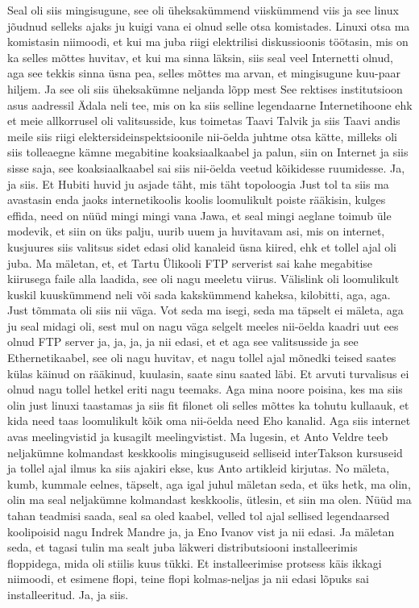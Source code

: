 Seal oli siis mingisugune, see oli üheksakümmend viiskümmend viis ja see linux jõudnud selleks ajaks ju kuigi vana ei olnud selle otsa komistades.
Linuxi otsa ma komistasin niimoodi, et kui ma juba riigi elektrilisi diskussioonis töötasin, mis on ka selles mõttes huvitav, et kui ma sinna läksin, siis seal veel Internetti olnud, aga see tekkis sinna üsna pea, selles mõttes ma arvan, et mingisugune kuu-paar hiljem. Ja see oli siis üheksakümne neljanda lõpp mest See rektises institutsioon asus aadressil Ädala neli tee, mis on ka siis selline legendaarne Internetihoone ehk et meie allkorrusel oli valitsusside, kus toimetas Taavi Talvik ja siis Taavi andis meile siis riigi elektersideinspektsioonile nii-öelda juhtme otsa kätte, milleks oli siis tolleaegne kämne megabitine koaksiaalkaabel ja palun, siin on Internet ja siis sisse saja, see koaksiaalkaabel sai siis nii-öelda veetud kõikidesse ruumidesse. Ja, ja siis.
Et Hubiti huvid ju asjade täht, mis täht topoloogia
Just tol ta siis ma avastasin enda jaoks internetikoolis koolis loomulikult poiste rääkisin, kulges effida, need on nüüd mingi mingi vana Jawa, et seal mingi aeglane toimub üle modevik, et siin on üks palju, uurib uuem ja huvitavam asi, mis on internet, kusjuures siis valitsus sidet edasi olid kanaleid üsna kiired, ehk et tollel ajal oli juba. Ma mäletan, et, et Tartu Ülikooli FTP serverist sai kahe megabitise kiirusega faile alla laadida, see oli nagu meeletu viirus. Välislink oli loomulikult kuskil kuuskümmend neli või sada kakskümmend kaheksa, kilobitti, aga, aga.
Just tõmmata oli siis nii väga.
Vot seda ma isegi, seda ma täpselt ei mäleta, aga ju seal midagi oli, sest mul on nagu väga selgelt meeles nii-öelda kaadri uut ees olnud FTP server ja, ja, ja, ja nii edasi, et et aga see valitsusside ja see Ethernetikaabel, see oli nagu huvitav, et nagu tollel ajal mõnedki teised saates külas käinud on rääkinud, kuulasin, saate sinu saated läbi. Et arvuti turvalisus ei olnud nagu tollel hetkel eriti nagu teemaks. Aga mina noore poisina, kes ma siis olin just linuxi taastamas ja siis fit filonet oli selles mõttes ka tohutu kullaauk, et kida need taas loomulikult kõik oma nii-öelda need Eho kanalid. Aga siis internet avas meelingvistid ja kusagilt meelingvistist. Ma lugesin, et Anto Veldre teeb neljakümne kolmandast keskkoolis mingisuguseid selliseid interTakson kursuseid ja tollel ajal ilmus ka siis ajakiri ekse, kus Anto artikleid kirjutas. No mäleta, kumb, kummale eelnes, täpselt, aga igal juhul mäletan seda, et üks hetk, ma olin, olin ma seal neljakümne kolmandast keskkoolis, ütlesin, et siin ma olen. Nüüd ma tahan teadmisi saada, seal sa oled kaabel, velled tol ajal sellised legendaarsed koolipoisid nagu Indrek Mandre ja, ja Eno Ivanov vist ja nii edasi. Ja mäletan seda, et tagasi tulin ma sealt juba läkweri distributsiooni installeerimis floppidega, mida oli stiilis kuus tükki. Et installeerimise protsess käis ikkagi niimoodi, et esimene flopi, teine flopi kolmas-neljas ja nii edasi lõpuks sai installeeritud. Ja, ja siis.
